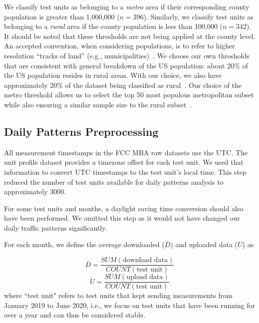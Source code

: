 \documentclass[conference,10pt]{IEEEtran}
\begin{document}
We classify test units as belonging to a \emph{metro} area if their corresponding county population is greater than 1,000,000 ($n=396$). Similarly, we classify test units as belonging to a \emph{rural} area if the county population is less than 100,000 ($n=342$). It should be noted that these thresholds are not being applied at the county level. An accepted convention, when considering populations, is to refer to higher resolution ``tracks of land'' (e.g., municipalities)~\cite{censusMSA}. We choose our own thresholds that are consistent with general breakdown of the \gls{US} population: about 20\% of the \gls{US} population resides in rural areas. With our choice, we also have approximately 20\% of the dataset being classified as rural~\cite{metroRural}. Our choice of the metro threshold allows us to select the top 50 most populous metropolitan subset while also ensuring a similar sample size to the rural subset~\cite{censusMSA}.

\subsection{Daily Patterns Preprocessing}

All measurement timestamps in the \gls{FCC} \gls{MBA} raw datasets use the \gls{UTC}. The unit profile dataset provides a timezone offset for each test unit. We used that information to convert \gls{UTC} timestamps to the test unit's local time. This step reduced the number of test units available for daily patterns analysis to approximately 3000.

For some test units and months, a daylight saving time conversion should also have been performed. We omitted this step as it would not have changed our daily traffic patterns significantly.

For each month, we define the average downloaded ($\overline{D}$) and uploaded data ($\overline{U}$) as

\begin{equation}
    \overline{D} =\frac{SUM(\text{download data})}{COUNT(\text{test unit})}
\end{equation}
\begin{equation}
    \overline{U} =\frac{SUM(\text{upload data})}{COUNT(\text{test unit})}
\end{equation}
where ``test unit" refers to test units that kept sending measurements from January 2019 to June 2020, i.e., we focus on test units that have been running for over a year and can thus be considered stable.
\end{document}
